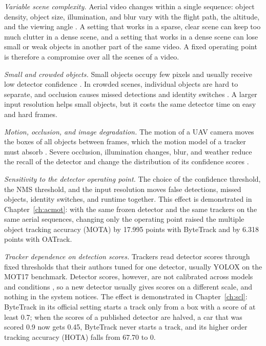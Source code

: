 \emph{Variable scene complexity.} Aerial video changes within a single sequence: object density, object size, illumination, and blur vary with the flight path, the altitude, and the viewing angle \cite{zhu2022visdrone,du2018uavdt}. A setting that works in a sparse, clear scene can keep too much clutter in a dense scene, and a setting that works in a dense scene can lose small or weak objects in another part of the same video. A fixed operating point is therefore a compromise over all the scenes of a video.

\emph{Small and crowded objects.} Small objects occupy few pixels and usually receive low detector confidence \cite{cheng2023smallobject}. In crowded scenes, individual objects are hard to separate, and occlusion causes missed detections and identity switches \cite{li2025motreview,ismail2026realtime}. A larger input resolution helps small objects, but it costs the same detector time on easy and hard frames.

\emph{Motion, occlusion, and image degradation.} The motion of a UAV camera moves the boxes of all objects between frames, which the motion model of a tracker must absorb \cite{liu2022uavmot}. Severe occlusion, illumination changes, blur, and weather reduce the recall of the detector and change the distribution of its confidence scores \cite{chae2024radar,ismail2026realtime}.

\emph{Sensitivity to the detector operating point.} The choice of the confidence threshold, the NMS threshold, and the input resolution moves false detections, missed objects, identity switches, and runtime together. This effect is demonstrated in Chapter~\ref{ch:acmot}: with the same frozen detector and the same trackers on the same aerial sequences, changing only the operating point raised the multiple object tracking accuracy (MOTA) by 17.995 points with ByteTrack and by 6.318 points with OATrack.

\emph{Tracker dependence on detection scores.} Trackers read detector scores through fixed thresholds that their authors tuned for one detector, usually YOLOX \cite{ge2021yolox} on the MOT17 benchmark. Detector scores, however, are not calibrated across models and conditions \cite{guo2017calibration,kuppers2020detcalib}, so a new detector usually gives scores on a different scale, and nothing in the system notices. The effect is demonstrated in Chapter~\ref{ch:scl}: ByteTrack in its official setting starts a track only from a box with a score of at least 0.7; when the scores of a published detector are halved, a car that was scored 0.9 now gets 0.45, ByteTrack never starts a track, and its higher order tracking accuracy (HOTA) \cite{luiten2021hota} falls from 67.70 to 0.

